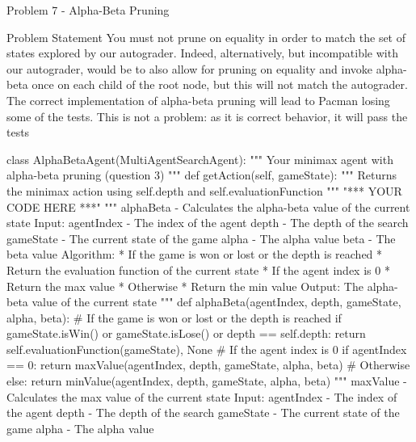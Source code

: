 \begin{problem}{Problem 7 - Alpha-Beta Pruning}
\begin{statement}{Problem Statement}
        You must not prune on equality in order to match the set of states explored by our autograder. Indeed, alternatively, but incompatible with our autograder, would be to also allow for pruning 
        on equality and invoke alpha-beta once on each child of the root node, but this will not match the autograder. The correct implementation of alpha-beta pruning will lead to Pacman losing some 
        of the tests. This is not a problem: as it is correct behavior, it will pass the tests
    \end{statement}

    \begin{highlight}[Solution]
    \begin{code}[Python]
    class AlphaBetaAgent(MultiAgentSearchAgent):
    """
        Your minimax agent with alpha-beta pruning (question 3)
    """
    def getAction(self, gameState):
        """
            Returns the minimax action using self.depth and self.evaluationFunction
        """
        "*** YOUR CODE HERE ***"
        """ alphaBeta - Calculates the alpha-beta value of the current state
                Input:
                agentIndex - The index of the agent
                depth - The depth of the search
                gameState - The current state of the game
                alpha - The alpha value
                beta - The beta value
                Algorithm:
                * If the game is won or lost or the depth is reached
                    * Return the evaluation function of the current state
                * If the agent index is 0
                    * Return the max value
                * Otherwise
                    * Return the min value
                Output:
                The alpha-beta value of the current state
        """
        def alphaBeta(agentIndex, depth, gameState, alpha, beta):
            # If the game is won or lost or the depth is reached
            if gameState.isWin() or gameState.isLose() or depth == self.depth:
                return self.evaluationFunction(gameState), None
            # If the agent index is 0
            if agentIndex == 0:
                return maxValue(agentIndex, depth, gameState, alpha, beta)
            # Otherwise
            else:
                return minValue(agentIndex, depth, gameState, alpha, beta)
        """ maxValue - Calculates the max value of the current state
                Input:
                agentIndex - The index of the agent
                depth - The depth of the search
                gameState - The current state of the game
                alpha - The alpha value

\end{code}
\end{highlight}
\end{problem}
